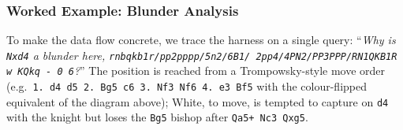 \subsubsection{Worked Example: Blunder Analysis}
\label{app:details:agent:example}

To make the data flow concrete, we trace the harness on a single query:
``\textsl{Why is \texttt{Nxd4} a blunder here, \texttt{rnbqkb1r/pp2pppp/5n2/6B1/\linebreak
2pp4/4PN2/PP3PPP/RN1QKB1R w KQkq - 0 6}?}''  The position is reached from a
Trompowsky-style move order (e.g.\ \texttt{1.\,d4 d5 2.\,Bg5 c6 3.\,Nf3 Nf6
4.\,e3 Bf5} with the colour-flipped equivalent of the diagram above); White,
to move, is tempted to capture on \texttt{d4} with the knight but loses the
\texttt{Bg5} bishop after \texttt{Qa5+ Nc3 Qxg5}.

